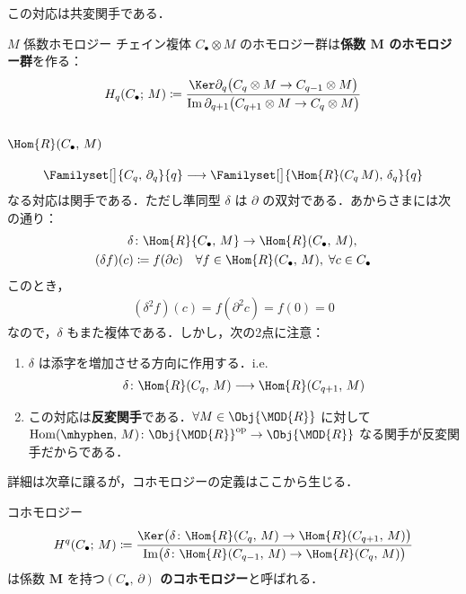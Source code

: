 \documentclass[algtopo_main]{subfiles}
\begin{document}
\begin{mylem}[]{}
    この対応は共変関手である．
\end{mylem}

\begin{mydef}[]{$M$ 係数ホモロジー}
    チェイン複体 $C_\bullet \otimes M$ のホモロジー群は\textbf{係数 $\bm{M}$ のホモロジー群}を作る：
    \begin{align}
        H_q(C_\bullet;\, M) \coloneqq \frac{\Ker \partial_q\bigl( C_q \otimes M \to C_{q-1} \otimes M\bigr) }{\Im \partial_{q+1}\bigl( C_{q+1}\otimes M \to C_{q} \otimes M\bigr)}
    \end{align}
\end{mydef}


\subsection{$\Hom{R} (C_\bullet,\, M)$}

\begin{align}
    \Familyset[\big]{C_q,\, \partial_q}{q} \longrightarrow \Familyset[\big]{\Hom{R}(C_q\, M),\, \delta_q}{q}
\end{align}
なる対応は関手である．ただし準同型 $\delta$ は $\partial$ の双対である．あからさまには次の通り：
\begin{align}
    \delta &\colon \Hom{R}{C_\bullet,\, M} \to \Hom{R}(C_\bullet,\, M),\\
    (\delta f)(c) &\coloneqq f(\partial c)\quad \forall f \in \Hom{R}(C_\bullet,\, M),\; \forall c \in C_\bullet
\end{align}
このとき，
\begin{align}
    (\delta^2 f)(c) = f(\partial^2 c) = f(0) = 0
\end{align}
なので，$\delta$ もまた複体である．しかし，次の2点に注意：
\begin{enumerate}
    \item $\delta$ は添字を増加させる方向に作用する．i.e.
    \begin{align}
        \delta \colon \Hom{R}(C_q,\, M) \longrightarrow \Hom{R}(C_{q+1},\, M)
    \end{align}
    \item この対応は\textbf{反変関手}である．$\forall M \in \Obj{\MOD{R}}$ に対して $\mathrm{Hom}(\mhyphen,\, M) \colon \Obj{\MOD{R}}^{\mathrm{op}} \to \Obj{\MOD{R}}$ なる関手が反変関手だからである．
\end{enumerate}
詳細は次章に譲るが，コホモロジーの定義はここから生じる．
\begin{mydef}[label=def:cohomology1]{コホモロジー}
    \begin{align}
        H^q(C_\bullet;\, M) \coloneqq \frac{\Ker \bigl( \delta \colon \Hom{R}(C_q,\, M) \to \Hom{R}(C_{q+1},\, M) \bigr) }{\Im \bigl( \delta \colon \Hom{R}(C_{q-1},\, M) \to \Hom{R}(C_{q},\, M) \bigr) }
    \end{align}
    は係数 $\bm{M}$ を持つ\textbf{$(C_\bullet,\, \partial)$ のコホモロジー}と呼ばれる．
\end{mydef}
\end{document}
